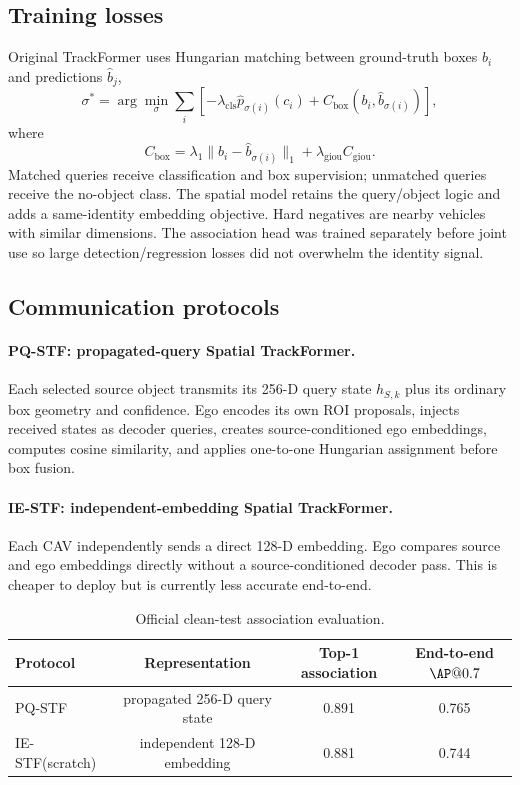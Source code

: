 \documentclass[11pt]{article}
\newcommand{\PQSTF}{\textsc{PQ-STF}}
\newcommand{\IESTF}{\textsc{IE-STF}}
\begin{document}
\subsection{Training losses}

Original TrackFormer uses Hungarian matching between ground-truth boxes $b_i$
and predictions $\hat b_j$,
\begin{equation}
 \sigma^*=\arg\min_\sigma\sum_i\left[-\lambda_{\mathrm{cls}}
 \hat p_{\sigma(i)}(c_i)+C_{\mathrm{box}}(b_i,\hat b_{\sigma(i)})\right],
\end{equation}
where
\begin{equation}
 C_{\mathrm{box}}=\lambda_1\lVert b_i-\hat b_{\sigma(i)}\rVert_1+
 \lambda_{\mathrm{giou}}C_{\mathrm{giou}}.
\end{equation}
Matched queries receive classification and box supervision; unmatched queries
receive the no-object class. The spatial model retains the query/object logic
and adds a same-identity embedding objective. Hard negatives are nearby
vehicles with similar dimensions. The association head was trained separately
before joint use so large detection/regression losses did not overwhelm the
identity signal.

\subsection{Communication protocols}

\paragraph{\PQSTF: propagated-query Spatial TrackFormer.}
Each selected source object transmits its 256-D query state $h_{S,k}$ plus its
ordinary box geometry and confidence. Ego encodes its own ROI proposals,
injects received states as decoder queries, creates source-conditioned ego
embeddings, computes cosine similarity, and applies one-to-one Hungarian
assignment before box fusion.

\paragraph{\IESTF: independent-embedding Spatial TrackFormer.}
Each CAV independently sends a direct 128-D embedding. Ego compares source
and ego embeddings directly without a source-conditioned decoder pass. This
is cheaper to deploy but is currently less accurate end-to-end.

\begin{table}[h]
\centering
\caption{Official clean-test association evaluation.}
\label{tab:association}
\begin{tabular}{lccc}
\toprule
Protocol & Representation & Top-1 association & End-to-end $\AP@0.7$\\
\midrule
\PQSTF & propagated 256-D query state & 0.891 & 0.765\\
\IESTF (scratch) & independent 128-D embedding & 0.881 & 0.744\\
\bottomrule
\end{tabular}
\end{table}
\end{document}
